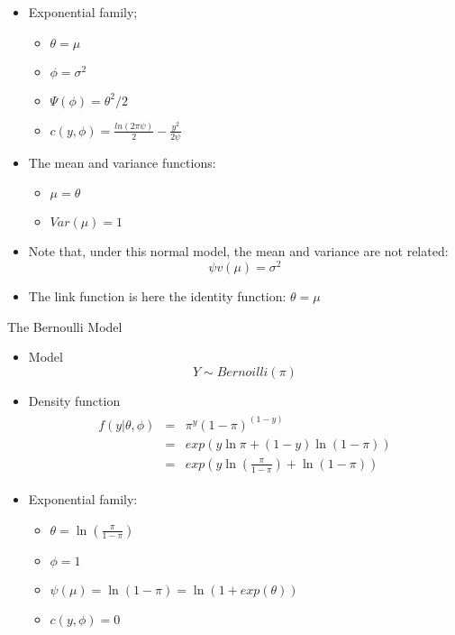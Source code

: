 \documentclass{beamer}
\begin{document}
\begin{frame}{}
\begin{itemize}
\item Exponential family;
\begin{itemize}
	\item $\theta=\mu$
	\item $\phi=\sigma^2$
	\item $\Psi(\phi)=\theta^2/2$
	\item $c(y,\phi)=\frac{ln(2\pi\psi)}{2}-\frac{y^{2}}{2\psi}$
\end{itemize}
	\item The mean and variance functions:
\begin{itemize}
	\item $\mu=\theta$
	\item $Var(\mu)=1$
\end{itemize}
\item Note that, under this normal model, the mean and variance are not related:
\[\psi v(\mu)=\sigma^2\]
\item The link function is here the identity function: $\theta=\mu$
\end{itemize}
\end{frame}

\begin{frame}{The Bernoulli Model}
\begin{itemize}
	\item Model 
	\[Y\sim Bernoilli(\pi)\]
	\item Density function 
	\begin{eqnarray*}
		\begin{array}{lll}
	f(y|\theta,\phi)&=&\pi^{y}(1-\pi)^(1-y) \\
	                &=&exp\left(y\ln\pi + (1-y)\ln(1-\pi)\right)\\
	                &=&exp\left(y\ln(\frac{\pi}{1-\pi})+\ln(1-\pi)\right)
		\end{array}
\end{eqnarray*}
\item Exponential family:
\begin{itemize}
	\item $\theta=\ln(\frac{\pi}{1-\pi})$
	\item $\phi=1$
	\item $\psi(\mu)=\ln(1-\pi)=\ln(1+exp(\theta))$
	\item $c(y,\phi)=0$
\end{itemize}
\end{itemize}
\end{frame}
\end{document}
